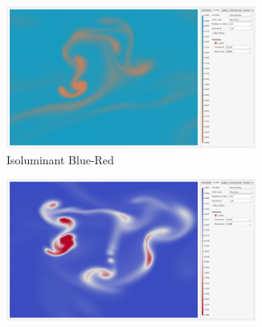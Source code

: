 \begin{figure}[htb]
\ContinuedFloat	
\centering
	\begin{subfigure}{0.35\textwidth}
		\centering
		\includegraphics[width=0.9\textwidth, trim={35px 30px 430px 30px}, clip]{colormapping/img/twocolors}
		\caption{
		Isoluminant Blue-Red
		}
		\label{fig:colormapping:intro:differntColorMaps:twocolor}
	\end{subfigure}	
	\hspace{30px}
	\begin{subfigure}{0.35\textwidth}
		\centering
		\includegraphics[width=0.9\textwidth, trim={35px 30px 430px 30px}, clip]{colormapping/img/diverging}

\end{subfigure}
\end{figure}
